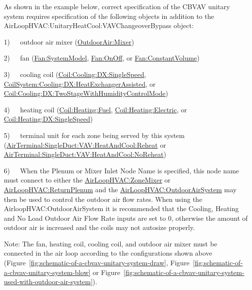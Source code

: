 As shown in the example below, correct specification of the CBVAV unitary system requires specification of the following objects in addition to the AirLoopHVAC:UnitaryHeatCool:VAVChangeoverBypass object:

1)~~~outdoor air mixer (\hyperref[outdoorairmixer]{OutdoorAir:Mixer})

2)~~~fan (\hyperref[fansystemmodel]{Fan:SystemModel}, \hyperref[fanonoff]{Fan:OnOff}, or \hyperref[fanconstantvolume]{Fan:ConstantVolume})

3)~~~cooling coil (\hyperref[coilcoolingdxsinglespeed]{Coil:Cooling:DX:SingleSpeed}, \hyperref[coilsystemcoolingdxheatexchangerassisted]{CoilSystem:Cooling:DX:HeatExchangerAssisted}, or \hyperref[coilcoolingdxtwostagewithhumiditycontrolmode]{Coil:Cooling:DX:TwoStageWithHumidityControlMode})

4)~~~heating coil (\hyperref[coilheatinggas-000]{Coil:Heating:Fuel}, \hyperref[coilheatingelectric]{Coil:Heating:Electric}, or \hyperref[coilheatingdxsinglespeed]{Coil:Heating:DX:SingleSpeed})

5)~~~terminal unit for each zone being served by this system (\hyperref[airterminalsingleductvavheatandcoolreheat]{AirTerminal:SingleDuct:VAV:HeatAndCool:Reheat} or \hyperref[airterminalsingleductvavheatandcoolnoreheat]{AirTerminal:SingleDuct:VAV:HeatAndCool:NoReheat})

6)~~~When the Plenum or Mixer Inlet Node Name is specified, this node name must connect to either the \hyperref[airloophvaczonemixer]{AirLoopHVAC:ZoneMixer} or \hyperref[airloophvacreturnplenum]{AirLoopHVAC:ReturnPlenum} and the \hyperref[airloophvacoutdoorairsystem]{AirLoopHVAC:OutdoorAirSystem} may then be used to control the outdoor air flow rates. When using the AirloopHVAC:OutdoorAirSystem it is recommended that the Cooling, Heating and No Load Outdoor Air Flow Rate inputs are set to 0, otherwise the amount of outdoor air is increased and the coils may not autosize properly.

Note: The fan, heating coil, cooling coil, and outdoor air mixer must be connected in the air loop according to the configurations shown above (Figure~\ref{fig:schematic-of-a-cbvav-unitary-system-draw}, Figure~\ref{fig:schematic-of-a-cbvav-unitary-system-blow} or Figure~\ref{fig:schematic-of-a-cbvav-unitary-system-used-with-outdoor-air-system}).

